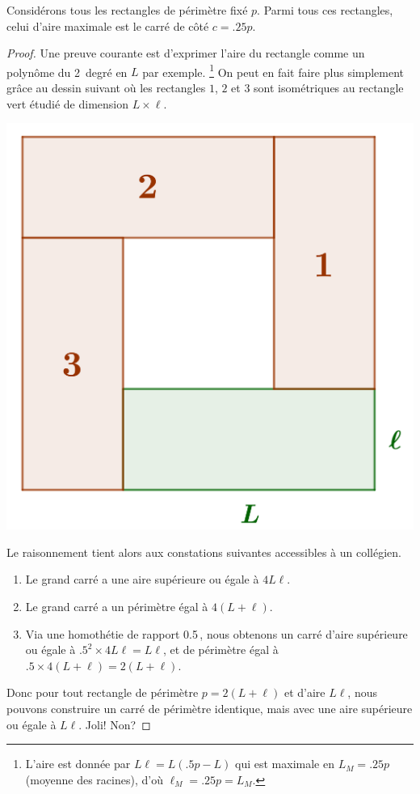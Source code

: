 \begin{fact} \label{iso-rect}
	Considérons tous les rectangles de périmètre fixé $p$. Parmi tous ces rectangles, celui d'aire maximale est le carré de côté $c = \num{.25} p$.
\end{fact}


\begin{proof}
	Une preuve courante est d'exprimer l'aire du rectangle comme un polynôme du 2\ieme\ degré en $L$ par exemple.%
	\footnote{
		L'aire est donnée par $L \ell = L (\num{.5} p - L)$ qui est maximale en $L_M = \num{.25} p$ (moyenne des racines), d'où $\ell_M = \num{.25} p = L_M$.
	}
	On peut en fait faire plus simplement grâce au dessin suivant où les rectangles $1$, $2$ et $3$ sont isométriques au rectangle vert étudié de dimension $L \times \ell$.

	\begin{center}
		\includegraphics[scale=.4]{content/rectangle/rectangle.png}
	\end{center}
	
	Le raisonnement tient alors aux constations suivantes accessibles à un collégien.
	\begin{enumerate}
		\item Le grand carré a une aire supérieure ou égale à $4 L \ell$.

		\item Le grand carré a un périmètre égal à $4 (L + \ell)$.

		\item Via une homothétie de rapport \num{.5}\,, nous obtenons un carré d'aire supérieure ou égale à $\num{.5}^2 \times 4 L \ell =  L \ell$, et de périmètre égal à $\num{.5} \times 4 (L + \ell) = 2 (L + \ell)$.
	\end{enumerate}
	
	Donc pour tout rectangle de périmètre $p = 2 (L + \ell)$ et d'aire $L \ell$, nous pouvons construire un carré de périmètre identique, mais avec une aire supérieure ou égale à  $L \ell$. Joli! Non?
\end{proof}


